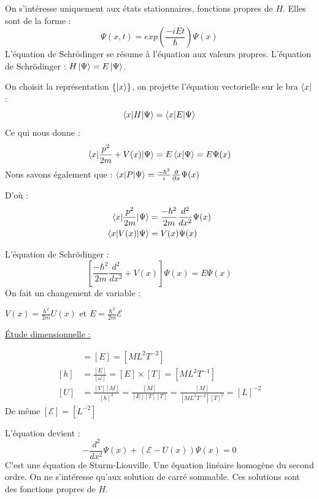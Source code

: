 \documentclass[12pt,a4paper,titlepage]{book}
\begin{document}
On s'intéresse uniquement aux états stationnaires, fonctions propres de $H$. Elles sont de la forme :
\begin{equation*}
\Psi (x,t) = exp \left( \frac{-i E t}{\hbar} \right) \Psi (x)
\end{equation*}
L'équation de Schrödinger se résume à l'équation aux valeurs propres. L'équation de Schrödinger : $H \ket\Psi = E \ket\Psi$.

On choisit la représentation $\lbrace \ket{x} \rbrace$, on projette l'équation vectorielle sur le bra $\bra{x}$ :
\begin{equation*}
\braket{x \vert H \vert \Psi} = \braket{x \vert E \vert \Psi}
\end{equation*}
Ce qui nous donne :
\begin{equation*}
\braket{x \vert \frac{p^2}{2m} + V(x) \vert \Psi} = E \braket{x \vert \Psi} = E \Psi (x)
\end{equation*}
Nous savons également que : $\braket{x \vert P \vert \Psi} = \frac{- \hbar^2}{i} \frac{\partial}{\partial x} \Psi (x) $

D'où :
\begin{align*}
\braket{x \vert \frac{p^2}{2m} \vert \Psi} &= \frac{- \hbar^2}{2 m} \frac{d^2}{dx^2} \Psi (x)\\
\braket{x \vert V(x) \vert \Psi} &= V(x) \Psi (x)
\end{align*}

L'équation de Schrödinger :
\begin{equation*}
\left[ \frac{- \hbar^2}{2m} \frac{d^2}{dx^2} + V(x) \right] \Psi (x) = E \Psi (x)
\end{equation*}
On fait un changement de variable :
\begin{center}
$V(x) = \frac{\hbar^2}{2m} U(x)$ et $E = \frac{\hbar^2}{2m} \mathcal{E}$
\end{center}

\underline{Étude dimensionnelle :}

\begin{align*}
[V] &= [E] = [M L^2 T^{-2}]\\
[h] &= \frac{[E]}{[\omega]} = [E] \times [T] = [M L^2 T^{-1}]\\
[U] &= \frac{[V][M]}{[\hbar]^2} = \frac{[M]}{[E][T][T]} = \frac{[M]}{[M L^2 T^{-2}][T]^2} = [L]^{-2}
\end{align*}
De même $[\mathcal{E}] = [L^{-2}]$

L'équation devient :
\begin{equation*}
-\frac{d^2}{dx^2} \Psi (x) + (\mathcal{E} - U(x)) \Psi(x) = 0
\end{equation*}
C'est une équation de Sturm-Liouville. Une équation linéaire homogène du second ordre. On ne s'intéresse qu'aux solution de carré sommable. Ces solutions sont des fonctions propres de $H$.
\end{document}
